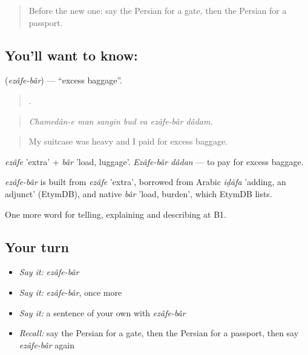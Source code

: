 \label{lesson:FA-C432-ezafe-bar}



\begin{quote}
Before the new one: say the Persian for a gate, then the Persian for a passport.
\end{quote}

\subsection*{You'll want to know:  }
\textbf{ } (\emph{ezâfe-bâr}) — \textquotedblleft{}excess baggage\textquotedblright{}.

\begin{quote}
       .
\end{quote}

\begin{quote}
\emph{Chamedân-e man sangin bud va ezâfe-bâr dâdam.}
\end{quote}

\begin{quote}
My suitcase was heavy and I paid for excess baggage.
\end{quote}

\emph{ezâfe} 'extra' + \emph{bâr} 'load, luggage'. \emph{Ezâfe-bâr dâdan} — to pay for excess baggage.

\begin{cousinweb}
\emph{ezâfe-bâr} is built from \emph{ezâfe} 'extra', borrowed from Arabic \emph{iḍāfa} 'adding, an adjunct' (EtymDB), and native \emph{bâr} 'load, burden', which EtymDB lists.
\end{cousinweb}

\begin{grammarlens}[title={What you've built}]
One more word for telling, explaining and describing at B1.
\end{grammarlens}

\subsection*{Your turn}
\begin{itemize}
\raggedright
  \item \emph{Say it:} \emph{ezâfe-bâr}
  \item \emph{Say it:} \emph{ezâfe-bâr}, once more
  \item \emph{Say it:} a sentence of your own with \emph{ezâfe-bâr}
  \item \emph{Recall:} say the Persian for a gate, then the Persian for a passport, then say \emph{ezâfe-bâr} again
\end{itemize}

